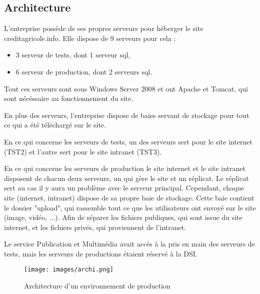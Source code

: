 \documentclass[12pt,a4paper]{article}
\begin{document}
\subsection{Architecture}
L'entreprise possède de ses propres serveurs pour héberger le site creditagricole.info. Elle dispose de 9 serveurs pour cela :
\begin{itemize}
\item 3 serveur de tests, dont 1 serveur sql,
\item 6 serveur de production, dont 2 serveurs sql.
\end{itemize}
Tout ces serveurs sont sous Windows Server 2008 et ont Apache et Tomcat, qui sont nécéssaire au fonctionnement du site.\par
En plus des serveurs, l'entreprise dispose de baies servant de stockage pour tout ce qui a été téléchargé sur le site.\par 
En ce qui concerne les serveurs de tests, un des serveurs sert pour le site internet (TST2) et l'autre sert pour le site intranet (TST3).\par
En ce qui concerne les serveurs de production le site internet et le site intranet disposent de chacun deux serveurs, un qui gère le site et un réplicat. Le réplicat sert au cas il y aura un problème avec le serveur principal. Cependant, chaque site (internet, intranet) dispose de sa propre baie de stockage. Cette baie contient le dossier "upload", qui rassemble tout ce que les utilisateurs ont envoyé sur le site (image, vidéo, ...). Afin de séparer les fichiers publiques, qui sont issue du site internet, et les fichiers privés, qui proviennent de l'intranet.\par
Le service Publication et Multimédia avait accès à la pris en main des serveurs de tests, mais les serveurs de productions étaient réservé à la DSI.\par
\begin{figure}[h!]
\centering
\texttt{[image: images/archi.png]} 
\caption{Architecture d'un environnement de production}
\end{figure}
\newpage
\end{document}
